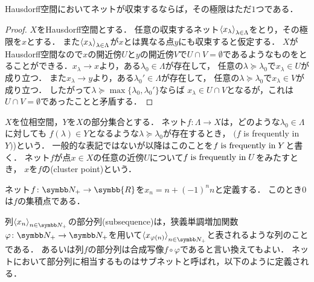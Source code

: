 \documentclass{ltjsbook}
\begin{document}
\begin{thmbox}
\begin{proposition}
Hausdorff空間においてネットが収束するならば，その極限はただ\(1\)つである．
\end{proposition}
\end{thmbox}

\begin{proof} \(X\)をHausdorff空間とする．
任意の収束するネット\({\langle {x}_\lambda \rangle}_{\lambda \in \Lambda}\)をとり，その極限を\(x\)とする．
また\({\langle {x}_\lambda \rangle}_{\lambda \in \Lambda}\)が\(x\)とは異なる点\(y\)にも収束すると仮定する．
\(X\)がHausdorff空間なので\(x\)の開近傍\(U\)と\(y\)の開近傍\(V\)で\(U \cap V = \emptyset\)であるようなものをとることができる．\(x_\lambda \to x\)より，ある\(\lambda_0 \in \Lambda\)が存在して，
任意の\(\lambda \succeq \lambda_0\)で\(x_\lambda \in U\)が成り立つ．
また\(x_\lambda \to y\)より，ある\(\lambda_0' \in \Lambda\)が存在して，
任意の\(\lambda \succeq \lambda_0\)で\(x_\lambda \in V\)が成り立つ．
したがって\(\lambda \succeq \max \{\lambda_0, \lambda_0'\}\)ならば
\(x_\lambda \in U \cap V\)となるが，これは\(U \cap V = \emptyset\)であったことと矛盾する．
\end{proof}

\begin{thmbox}
\begin{definition}
\(X\)を位相空間，\(Y\)を\(X\)の部分集合とする．
ネット\(f \colon \Lambda \to X\)は，どのような\(\lambda_0 \in \Lambda\)に対しても
\(f(\lambda) \in Y\)となるような\(\lambda \succeq \lambda_0\)が存在するとき，
\((f\) is frequently in \(Y)\))という．
一般的な表記ではないが以降はこのことを\(f \mathrel{\text{is frequently in}} Y\)と書く．
ネット\(f\)が点\(x \in X\)の任意の近傍\(U\)について\(f \mathrel{\text{is frequently in}} U\)をみたすとき，
\(x\)を\(f\)の(cluster point)という．
\end{definition}
\end{thmbox}

\begin{example}
ネット\(f\colon \PositiveInteger \to \symbb{R}\)を\(x_n = n + (-1)^n n\)と定義する．
このとき\(0\)は\(f\)の集積点である．
\end{example}


列\(\Sequencen{x}\)の部分列(subsequence)は，狭義単調増加関数\(\varphi\colon\PositiveInteger\to\PositiveInteger\)を用いて\(\Subsequence{x}\)と表されるような列のことである．
あるいは列\(f\)の部分列は合成写像\(f\circ \varphi\)であると言い換えてもよい．
ネットにおいて部分列に相当するものはサブネットと呼ばれ，以下のように定義される．
\end{document}
